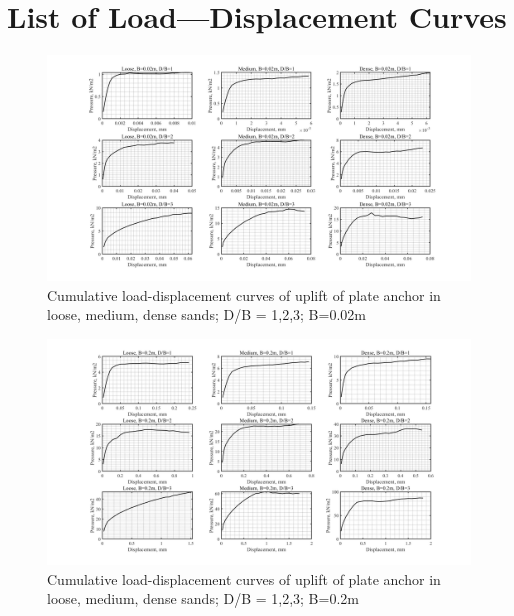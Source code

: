 \documentclass[a4paper, nobind]{templates/ociamthesis}
\begin{document}
\begin{landscape}

\hypertarget{list-of-loaddisplacement-curves}{%
\chapter{List of Load---Displacement Curves}\label{list-of-loaddisplacement-curves}}

\begin{figure}[H]
\includegraphics[width=1\linewidth]{myfigureeeeee/CodeA} \caption{Cumulative load-displacement curves of uplift of plate anchor in loose, medium, dense sands; D/B = 1,2,3; B=0.02m }\label{fig:unnamed-chunk-53}
\end{figure}

\begin{figure}[H]
\includegraphics[width=1\linewidth]{myfigureeeeee/CodeB} \caption{Cumulative load-displacement curves of uplift of plate anchor in loose, medium, dense sands; D/B = 1,2,3; B=0.2m}\label{fig:unnamed-chunk-54}
\end{figure}


\end{landscape}
\end{document}

